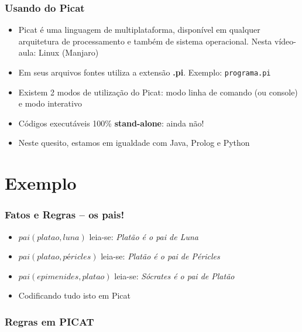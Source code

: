 \documentclass[10pt]{beamer}
\begin{document}
\begin{frame}
    \frametitle{Usando do Picat}
    \begin{itemize}
     \item Picat é uma linguagem de multiplataforma, disponível em qualquer arquitetura de processamento e também de sistema operacional. Nesta vídeo-aula: Linux (Manjaro)
     \item Em seus arquivos fontes utiliza a extensão \textbf{.pi}. Exemplo: \texttt{programa.pi}
     \item Existem 2 modos de utilização do Picat: modo linha de comando (ou console) e modo interativo
     \item Códigos executáveis 100\% \textbf{stand-alone}: ainda não!
     \item Neste quesito, estamos em igualdade com Java, Prolog e Python
     
    \end{itemize}
\end{frame}


\section{Exemplo}
\begin{frame}
    \frametitle{Fatos e Regras -- os pais!}
    \begin{itemize}
    
    \item $pai(platao, luna)$ \hspace{1.5cm} leia-se: \textit{Platão é o pai de Luna}
    \item $pai(platao, péricles)$ \hspace{1.5cm} leia-se: \textit{Platão é o pai de Péricles}
    \item $pai(epimenides, platao)$ \hspace{1.5cm} leia-se: \textit{Sócrates é o pai de Platão}
    \item Codificando tudo isto  em Picat
    \end{itemize}
\end{frame}

\begin{frame}[allowframebreaks=0.9]
 \frametitle{Regras em PICAT}



\end{frame}
\end{document}
